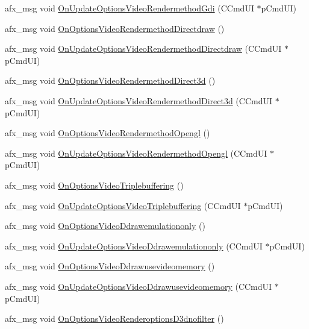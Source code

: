 \begin{DoxyCompactItemize}
afx\+\_\+msg void \mbox{\hyperlink{class_main_wnd_aa9bcdd260d4a368a3ae7b3b988b5adb6}{On\+Update\+Options\+Video\+Rendermethod\+Gdi}} (C\+Cmd\+UI $\ast$p\+Cmd\+UI)
\item 
afx\+\_\+msg void \mbox{\hyperlink{class_main_wnd_a09d758ad2d47abea0fbed2f778501958}{On\+Options\+Video\+Rendermethod\+Directdraw}} ()
\item 
afx\+\_\+msg void \mbox{\hyperlink{class_main_wnd_aeb37587c171ba07587e8ae76b18afa61}{On\+Update\+Options\+Video\+Rendermethod\+Directdraw}} (C\+Cmd\+UI $\ast$p\+Cmd\+UI)
\item 
afx\+\_\+msg void \mbox{\hyperlink{class_main_wnd_aa90dfd9dfe90390a030a60e484af0958}{On\+Options\+Video\+Rendermethod\+Direct3d}} ()
\item 
afx\+\_\+msg void \mbox{\hyperlink{class_main_wnd_a8779ba5e97c383930dcaa658e6f26438}{On\+Update\+Options\+Video\+Rendermethod\+Direct3d}} (C\+Cmd\+UI $\ast$p\+Cmd\+UI)
\item 
afx\+\_\+msg void \mbox{\hyperlink{class_main_wnd_ad8709590f7d9289c19ec3a216490d742}{On\+Options\+Video\+Rendermethod\+Opengl}} ()
\item 
afx\+\_\+msg void \mbox{\hyperlink{class_main_wnd_a7871df88f8403990a518d441b242a633}{On\+Update\+Options\+Video\+Rendermethod\+Opengl}} (C\+Cmd\+UI $\ast$p\+Cmd\+UI)
\item 
afx\+\_\+msg void \mbox{\hyperlink{class_main_wnd_a3d08e3bf2be9dee73c57674e4a6d890e}{On\+Options\+Video\+Triplebuffering}} ()
\item 
afx\+\_\+msg void \mbox{\hyperlink{class_main_wnd_afe2f2080e99e36884b1cc80dcc996520}{On\+Update\+Options\+Video\+Triplebuffering}} (C\+Cmd\+UI $\ast$p\+Cmd\+UI)
\item 
afx\+\_\+msg void \mbox{\hyperlink{class_main_wnd_a69c7fd2297cf789a4d25ffd6099776e6}{On\+Options\+Video\+Ddrawemulationonly}} ()
\item 
afx\+\_\+msg void \mbox{\hyperlink{class_main_wnd_a970b6c15909603ac56471c2275170791}{On\+Update\+Options\+Video\+Ddrawemulationonly}} (C\+Cmd\+UI $\ast$p\+Cmd\+UI)
\item 
afx\+\_\+msg void \mbox{\hyperlink{class_main_wnd_a1ba5ef62512a0cdef95369a411bb3c0d}{On\+Options\+Video\+Ddrawusevideomemory}} ()
\item 
afx\+\_\+msg void \mbox{\hyperlink{class_main_wnd_a142e1ed6bc371e50341d8e60ce1afa82}{On\+Update\+Options\+Video\+Ddrawusevideomemory}} (C\+Cmd\+UI $\ast$p\+Cmd\+UI)
\item 
afx\+\_\+msg void \mbox{\hyperlink{class_main_wnd_add9253b241396c29c979ef81199b7fb3}{On\+Options\+Video\+Renderoptions\+D3dnofilter}} ()

\end{DoxyCompactItemize}
